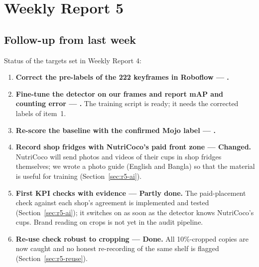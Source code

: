 
\section{Weekly Report 5}

\subsection{Follow-up from last week}
Status of the targets set in Weekly Report 4:
\begin{enumerate}
  \item \textbf{Correct the pre-labels of the 222 keyframes in Roboflow --- .}
  \item \textbf{Fine-tune the detector on our frames and report mAP and counting error --- .}
  The training script is ready; it needs the corrected labels of item~1.
  \item \textbf{Re-score the baseline with the confirmed Mojo label --- .}
  \item \textbf{Record shop fridges with NutriCoco's paid front zone --- Changed.} NutriCoco will send
  photos and videos of their cups in shop fridges themselves; we wrote a photo guide (English and
  Bangla) so that the material is useful for training (Section~\ref{sec:r5-ai}).
  \item \textbf{First KPI checks with evidence --- Partly done.} The paid-placement check against each
  shop's agreement is implemented and tested (Section~\ref{sec:r5-ai}); it switches on as soon as the
  detector knows NutriCoco's cups. Brand reading on crops is not yet in the audit pipeline.
  \item \textbf{Re-use check robust to cropping --- Done.} All 10\%-cropped copies are now caught and
  no honest re-recording of the same shelf is flagged (Section~\ref{sec:r5-reuse}).
\end{enumerate}

